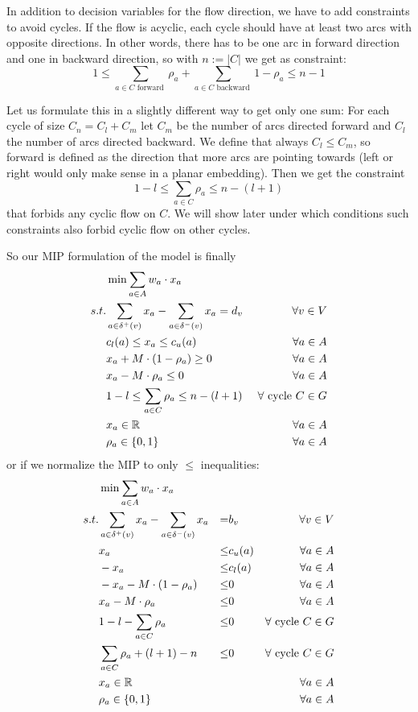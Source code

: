 In addition to decision variables for the flow direction, we have to add constraints to avoid cycles. If the flow is 
acyclic, each cycle should have at least two arcs with opposite directions. In other words, there has to be one arc
in forward direction and one in backward direction, so with $n:=|C|$ we get as constraint:
$$ 1\le\sum_{a\in C\textrm{ forward }} \rho_a + \sum_{a\in C\textrm{ backward }}1-\rho_a\le n-1$$

Let us formulate this in a slightly different way to get only one sum: For each cycle of size $C_n=C_l+C_m$ 
let $C_m$ be the number of arcs directed forward and $C_l$ the number of arcs directed backward. We define that always 
$C_l\le C_m$, so forward is defined as the direction that more arcs are pointing towards (left or right would only 
make sense in a planar embedding). Then we get the constraint $$1-l \le \sum_{a\in C}\rho_a\le n-(l+1)$$ that forbids 
any cyclic flow on $C$. We will show later under which conditions such constraints also forbid cyclic flow on other 
cycles. 

So our MIP formulation of the model is finally
\begin{align*}
 &\min \sum_{a\in A} w_a\cdot x_a & \\
 s.t. & \sum_{a\in \delta^+(v)}x_a - \sum_{a\in\delta^- (v)}x_a = d_v\ &\forall v\in V \\
  & c_l(a)\le x_a \le c_u(a) & \forall a\in A\\
 &x_a + M\cdot (1-\rho_a) \ge 0 & \forall a\in A\\
 &x_a - M\cdot \rho_a \le 0 & \forall a\in A\\
 &1-l \le \sum_{a\in C}\rho_a \le n-(l+1) & \forall \textrm{ cycle }C\in G\\
 & x_a \in \mathbb{R} &\forall a\in A\\
 & \rho_a \in \{0,1\} &\forall a\in A
\end{align*}
or if we normalize the MIP to only $\le$ inequalities:
\begin{align}
 &\min \sum_{a\in A} w_a\cdot x_a & \\
 s.t. & \sum_{a\in \delta^+(v)}x_a - \sum_{a\in\delta^- (v)}x_a &=& b_v\ &\forall v\in V \\
 & x_a &\le& c_u(a) & \forall a\in A\\
 & -x_a &\le& c_l(a) & \forall a\in A\\
 &-x_a - M\cdot (1-\rho_a) &\le& 0 & \forall a\in A\\
 &x_a - M\cdot \rho_a &\le& 0 & \forall a\in A\\
 &1-l - \sum_{a\in C}\rho_a &\le& 0 & \forall \textrm{ cycle }C\in G\\
 & \sum_{a\in C}\rho_a +(l+1)-n &\le& 0 & \forall \textrm{ cycle }C\in G\\
 & x_a \in \mathbb{R} & & &\forall a\in A\\
 & \rho_a \in \{0,1\} & & &\forall a\in A
\end{align}


